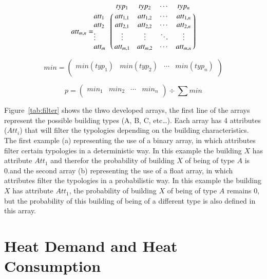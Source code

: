 \begin{equation} \label{eq:att}
att_{m,n} = \bordermatrix{~ & typ_1 & typ_2 & \cdots & typ_n \cr
	att_1 & att_{1,1} & att_{1,2} & \cdots & att_{1,n} \cr
	att_2 & att_{2,1} & att_{2,2} & \cdots & att_{2,n} \cr
	\vdots & \vdots  & \vdots  & \ddots & \vdots  \cr
	att_m & att_{m,1} & att_{m,2} & \cdots & att_{m,n}}
\end{equation}

\begin{equation} \label{eq:att1}
min = 
 \begin{pmatrix}
 min(typ_1) &
 min(typ_2) &
 \cdots &
 min(typ_n) \\
 \end{pmatrix}
\end{equation}

\begin{equation} \label{eq:att2}
p = 
 \begin{pmatrix}
 min_1 &
 min_2 &
 \cdots &
 min_n \\
 \end{pmatrix}
 \div \sum min
\end{equation}




Figure~\ref{tab:filter} shows the thwo developed arrays, the first line of the
arrays represent the possible building types (A, B, C, etc\dots).  Each array
has 4 attributes ($Att_{i}$) that will filter the typologies depending on the
building characteristics.  The first example (a) representing the use of a
binary array, in which attributes filter certain typologies in a deterministic
way. In this example the building $X$ has attribute $Att_1$ and therefor the
probability of building $X$ of being of type $A$ is 0.\@ and the second array
(b) representing the use of a float array, in which attributes filter the
typologies in a probabilistic way. In this example the building $X$ has
attribute $Att_1$, the probability of building $X$ of being of type $A$ remains
0, but the probability of this building of being of a different type is also
defined in this array.

\section{Heat Demand and Heat Consumption}\label{sec:result}

